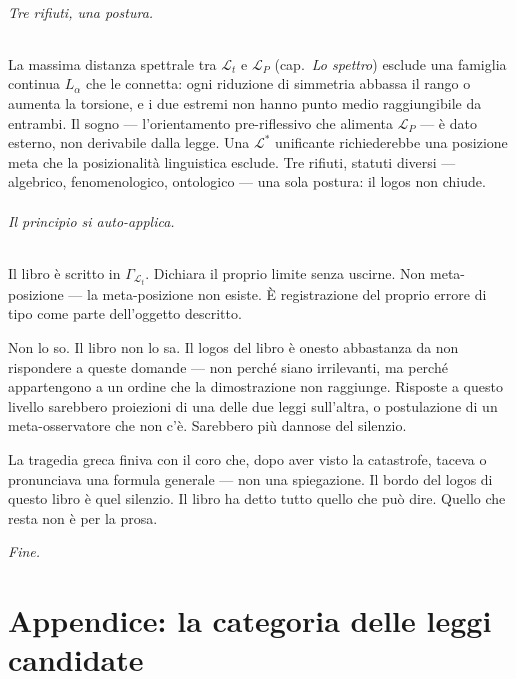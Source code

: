 \documentclass[
    oneside,                 %
    openany,                 %
    titlepage,
    11pt,
    a4paper,
    italian,
    DIV=14,                  %
    headinclude,
    footinclude=true,
    cleardoublepage=empty
]{scrbook}
\theoremstyle{ctplain}
\theoremstyle{ctdef}
\theoremstyle{ctrem}
\newcommand{\Lt}{\mathcal{L}_t}
\newcommand{\LP}{\mathcal{L}_P}
\begin{document}
\paragraph{Tre rifiuti, una postura.} La massima distanza spettrale tra $\Lt$ e $\LP$ (cap.~\emph{Lo spettro}) esclude una famiglia continua $L_\alpha$ che le connetta: ogni riduzione di simmetria abbassa il rango o aumenta la torsione, e i due estremi non hanno punto medio raggiungibile da entrambi. Il sogno --- l'orientamento pre-riflessivo che alimenta $\LP$ --- è dato esterno, non derivabile dalla legge. Una $\mathcal{L}^{*}$ unificante richiederebbe una posizione meta che la posizionalità linguistica esclude. Tre rifiuti, statuti diversi --- algebrico, fenomenologico, ontologico --- una sola postura: il logos non chiude.

\paragraph{Il principio si auto-applica.} Il libro è scritto in $\Gamma_{\Lt}$. Dichiara il proprio limite senza uscirne. Non meta-posizione --- la meta-posizione non esiste. È registrazione del proprio errore di tipo come parte dell'oggetto descritto.

\bigskip

Non lo so. Il libro non lo sa. Il logos del libro è onesto abbastanza da non rispondere a queste domande --- non perché siano irrilevanti, ma perché appartengono a un ordine che la dimostrazione non raggiunge. Risposte a questo livello sarebbero proiezioni di una delle due leggi sull'altra, o postulazione di un meta-osservatore che non c'è. Sarebbero più dannose del silenzio.

\bigskip

La tragedia greca finiva con il coro che, dopo aver visto la catastrofe, taceva o pronunciava una formula generale --- non una spiegazione. Il bordo del logos di questo libro è quel silenzio. Il libro ha detto tutto quello che può dire. Quello che resta non è per la prosa.

\bigskip\bigskip
\begin{center}
\emph{Fine.}
\end{center}

\part{Appendice: la categoria delle leggi candidate}
\end{document}
